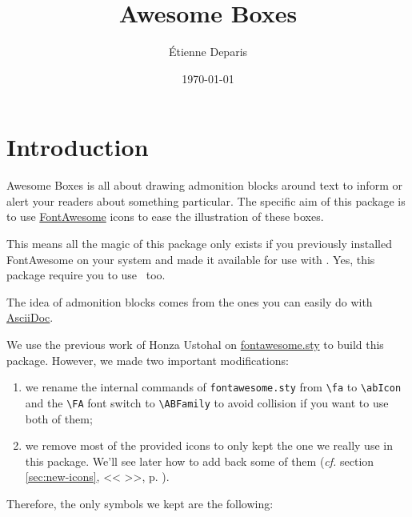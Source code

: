 \documentclass[a4paper,12pt]{article}
\title{Awesome Boxes}
\author{Étienne Deparis}
\date{\today}
\newcommand{\cf}[1]{(\emph{cf.} section \ref{#1}, %
  <<\,\nameref{#1}\,>>, p. \pageref{#1})}
\newcommand\hrefcolor[2]{\textcolor{magenta}{\href{#1}{#2}}}
\begin{document}
\maketitle

\section{Introduction}

Awesome Boxes is all about drawing admonition blocks around text to
inform or alert your readers about something particular. The specific
aim of this package is to use
\hrefcolor{http://fontawesome.io/icons/}{FontAwesome} icons to ease the
illustration of these boxes.

This means all the magic of this package only exists if you previously
installed FontAwesome on your system and made it available for use with
\XeTeX. Yes, this package require you to use \XeLaTeX\ too.

The idea of admonition blocks comes from the ones you can easily do with
\hrefcolor{http://asciidoctor.org/docs/user-manual/\#admonition}{AsciiDoc}.

We use the previous work of Honza Ustohal on
\hrefcolor{https://gist.github.com/sway/3101743}{fontawesome.sty} to
build this package. However, we made two important modifications:

\begin{enumerate}
\item we rename the internal commands of \texttt{fontawesome.sty} from
  \texttt{\textbackslash{}fa} to \texttt{\textbackslash{}abIcon} and the
  \texttt{\textbackslash{}FA} font switch to
  \texttt{\textbackslash{}ABFamily} to avoid collision if you want to
  use both of them;
\item we remove most of the provided icons to only kept the one we
  really use in this package. We'll see later how to add back some of
  them \cf{sec:new-icons}.
\end{enumerate}

Therefore, the only symbols we kept are the following:
\end{document}
